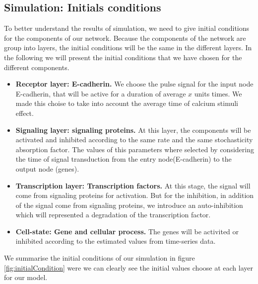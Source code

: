   


\subsection{Simulation: Initials conditions}
To better understand the results of simulation, we need to give initial conditions for the components of our network. Because the components of the network are group into 
layers, the initial conditions will be the same in the different layers. In the following we will present the initial conditions that we have chosen for the different 
components.

\begin{itemize}
 \item \textbf{Receptor layer: E-cadherin.} We choose the  pulse signal for the input node E-cadherin, that will be active for a duration of average $x$ units times. We made this 
 choise to take into account the average time of calcium stimuli effect.
 \item \textbf{Signaling layer: signaling proteins.} At this layer, the components will be activated and inhibited according to the same rate and the same stochasticity absorption factor.
 The values of this parameters where selected by considering the time of signal transduction from the entry node(E-cadherin) to the output node (genes).
 \item \textbf{Transcription layer: Transcription factors.} At this stage, the signal will come from signaling proteins for activation. But for the inhibition, in addition 
 of the signal come from signaling proteins, we introduce an auto-inhibition which will represented a degradation of the transcription factor.
 \item \textbf{Cell-state: Gene and cellular  process.} The genes will be activited or inhibited according to the estimated values from time-series data.
\end{itemize}

We summarise the initial conditions of our simulation in figure \ref{fig:initialCondition} were we can clearly see the initial values choose at each layer for our model.

